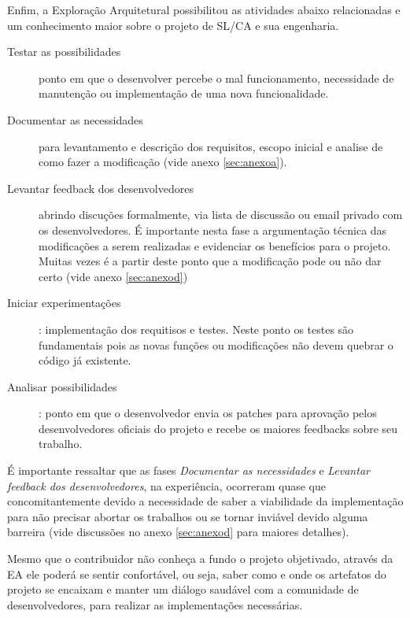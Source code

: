 
Enfim, a Exploração Arquitetural possibilitou as atividades abaixo relacionadas e um conhecimento maior sobre o projeto de SL/CA e sua engenharia. 
\begin{description}
\item [Testar as possibilidades] ponto em que o desenvolver percebe o mal funcionamento, necessidade de manutenção ou implementação de uma nova funcionalidade.
\item [Documentar as necessidades] para levantamento e descrição dos requisitos, escopo inicial e analise de como fazer a modificação (vide anexo \ref{sec:anexoa}).
\item [Levantar feedback dos desenvolvedores] abrindo discuções formalmente, via lista de discussão ou email privado com os desenvolvedores. É importante nesta fase a argumentação técnica das modificações a serem realizadas e evidenciar os benefícios para o projeto. Muitas vezes é a partir deste ponto que a modificação pode ou não dar certo (vide anexo \ref{sec:anexod})
\item [Iniciar experimentações]: implementação dos requitisos e testes. Neste ponto os testes são fundamentais pois as novas funções ou modificações não devem quebrar o código já existente.
\item [Analisar possibilidades]: ponto em que o desenvolvedor envia os patches para aprovação pelos desenvolvedores oficiais do projeto e recebe os maiores feedbacks sobre seu trabalho.   \end{description}

É importante ressaltar que as fases \textit{Documentar as necessidades} e \textit{Levantar feedback dos desenvolvedores}, na experiência, ocorreram quase que concomitantemente devido a necessidade de saber a viabilidade da implementação para não precisar abortar os trabalhos ou se tornar inviável devido alguma barreira (vide discussões no anexo \ref{sec:anexod} para maiores detalhes).

Mesmo que o contribuidor não conheça a fundo o projeto objetivado, através da EA ele poderá se sentir confortável, ou seja, saber como e onde os artefatos do projeto se encaixam e manter um diálogo saudável com a comunidade de desenvolvedores, para realizar as implementações necessárias.

